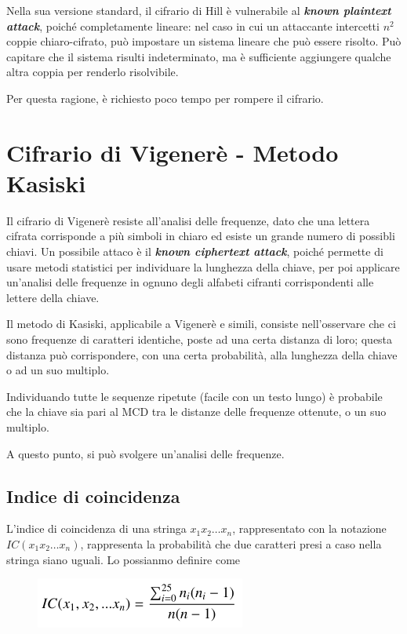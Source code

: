 Nella sua versione standard, il cifrario di Hill è vulnerabile al \textit{\textbf{known plaintext attack}}, poiché completamente lineare: nel 
caso in cui un attaccante intercetti $n^2$ coppie chiaro-cifrato, può impostare un sistema lineare che può essere risolto. Può capitare che il 
sistema risulti indeterminato, ma è sufficiente aggiungere qualche altra coppia per renderlo risolvibile.

\noindent Per questa ragione, è richiesto poco tempo per rompere il cifrario.

\section{Cifrario di Vigenerè - Metodo Kasiski}

Il cifrario di Vigenerè resiste all'analisi delle frequenze, dato che una lettera cifrata corrisponde a più simboli in chiaro ed esiste un grande 
numero di possibli chiavi.
Un possibile attaco è il \textit{\textbf{known ciphertext attack}}, poiché permette di usare metodi statistici per individuare la lunghezza della 
chiave, per poi applicare un'analisi delle frequenze in ognuno degli alfabeti cifranti corrispondenti alle lettere della chiave.

\noindent Il metodo di Kasiski, applicabile a Vigenerè e simili, consiste nell'osservare che ci sono frequenze di caratteri identiche, poste 
ad una certa distanza di loro; questa distanza può corrispondere, con una certa probabilità, alla lunghezza della chiave o ad un suo multiplo.

\noindent Individuando tutte le sequenze ripetute (facile con un testo lungo) è probabile che la chiave sia pari al MCD tra le distanze delle 
frequenze ottenute, o un suo multiplo.

\noindent A questo punto, si può svolgere un'analisi delle frequenze.

\subsection{Indice di coincidenza}

L'indice di coincidenza di una stringa $x_1x_2\dots x_n$, rappresentato con la notazione $IC(x_1x_2\dots x_n)$, rappresenta la probabilità 
che due caratteri presi a caso nella stringa siano uguali. Lo possianmo definire come 

\begin{figure}[H]
    \centering
    \includegraphics[width=0.4\linewidth]{chapters/chap3/images/pic1}
\end{figure}

